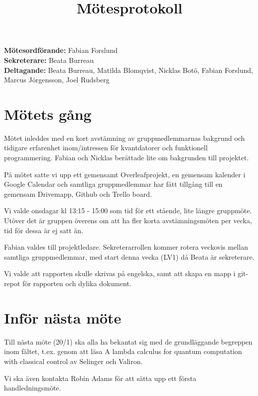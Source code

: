 \documentclass[11pt,a4paper]{article}
\title{Mötesprotokoll}
\newcommand{\secretary}{Beata Burreau}
\newcommand{\director}{Fabian Forslund}
\newcommand{\partaking}{Beata Burreau, Matilda Blomqvist, Nicklas Botö, 
                        Fabian Forslund, Marcus Jörgensson, Joel Rudsberg}
\begin{document}
\maketitle
\noindent
\textbf{Mötesordförande:} \director\\
\noindent
\textbf{Sekreterare:} \secretary\\
\noindent
\textbf{Deltagande:} \partaking
\section{Mötets gång}

Mötet inleddes med en kort avstämning av gruppmedlemmarnas bakgrund och tidigare erfarenhet 
inom/intressen för kvantdatorer och funktionell programmering. Fabian och Nicklas berättade lite om 
bakgrunden till projektet.

På mötet satte vi upp ett gemensamt Overleafprojekt, en gemensam kalender i Google Calendar och 
samtliga gruppmedlemmar har fått tillgång till en gemensam Drivemapp, Github och Trello board. 

Vi valde onsdagar kl 13:15 - 15:00 som tid för ett stående, lite längre gruppmöte. Utöver det är 
gruppen överens om att ha fler korta avstämningsmöten per vecka, tid för dessa är ej satt än. 

Fabian valdes till projektledare. Sekreterarrollen kommer rotera veckovis mellan samtliga 
gruppmedlemmar, med start denna vecka (LV1) då Beata är sekreterare. 

Vi valde att rapporten skulle skrivas på engelska, samt att skapa en mapp i git-repot för rapporten 
och dylika dokument.

\section{Inför nästa möte}

Till nästa möte (20/1) ska alla ha bekantat sig med de grundläggande begreppen inom fältet, t.ex. 
genom att läsa A lambda calculus for quantum computation with classical control av Selinger och Valiron. 

Vi ska även kontakta Robin Adams för att sätta upp ett första handledningsmöte. 
\end{document}
